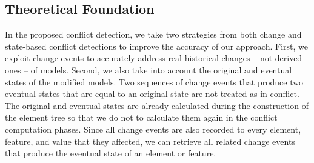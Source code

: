 \subsection{Theoretical Foundation} 
\label{sec:theoretical_foundation}
In the proposed conflict detection, we take two strategies from both change and state-based conflict detections to improve the accuracy of our approach. 
First, we exploit change events to accurately address real historical changes -- not derived ones -- of models. Second, we also take into account the original and eventual states of the modified models. Two sequences of change events that produce two eventual states that are equal to an original state are not treated as in conflict. The original and eventual states are already calculated during the construction of the \textsf{element tree} so that we do not to calculate them again in the conflict computation phases. Since all change events are also recorded to every element, feature, and value that they affected, we can retrieve all related change events that produce the eventual state of an element or feature. 

